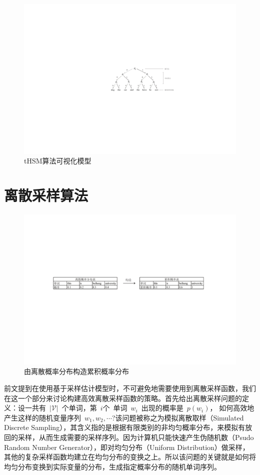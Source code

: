 \begin{figure}[!t]
  \centering
\includegraphics[width=.85\linewidth]{./figures/thsm-example.pdf}
\caption{tHSM算法可视化模型}\label{fig:case_thsm}
\end{figure}

\section{离散采样算法}
\begin{figure}[!t]
  \centering
\includegraphics[width=1\linewidth]{./figures/cdfreverse.pdf}
\caption{由离散概率分布构造累积概率分布}\label{fig:cdf_reverse}
\end{figure}

前文提到在使用基于采样估计模型时，不可避免地需要使用到离散采样函数，我们在这一个部分来讨论构建高效离散采样函数的策略。首先给出离散采样问题的定义：设一共有~$|\mathcal{V}|$~个单词，第~$i$个~单词~$w_i$~出现的概率是~$p(w_i)$， 如何高效地产生这样的随机变量序列~$w_1,w_2,\cdots$?该问题被称之为模拟离散取样（Simulated Discrete Sampling），其含义指的是根据有限类别的非均匀概率分布，来模拟有放回的采样，从而生成需要的采样序列。因为计算机只能快速产生伪随机数（Psudo Random Number Generator），即对均匀分布（Uniform Distribution）做采样，其他的复杂采样函数均建立在均匀分布的变换之上。所以该问题的关键就是如何将均匀分布变换到实际变量的分布，生成指定概率分布的随机单词序列。

